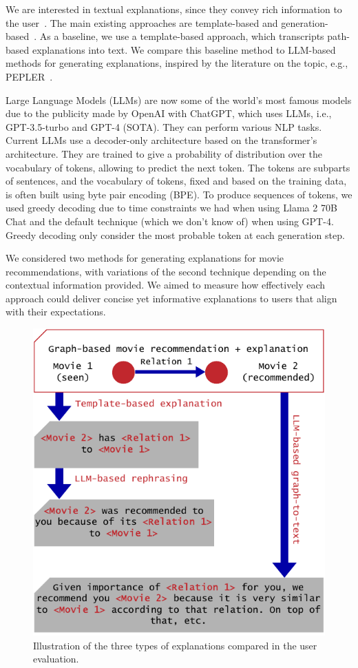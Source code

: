 We are interested in textual explanations, since they convey rich information to the user~\cite{Tintarev2015}. The main existing approaches are template-based and generation-based~\cite{Zhang2020}. As a baseline, we use a template-based approach, which transcripts path-based explanations into text. We compare this baseline method to LLM-based methods for generating explanations, inspired by the literature on the topic, e.g., PEPLER~\cite{Li2023PersonalizedPromptLearningExplainableRecommendation}.


Large Language Models (LLMs) are now some of the world's most famous models due to the publicity made by OpenAI with ChatGPT, which uses LLMs, i.e., GPT-3.5-turbo and GPT-4 (SOTA). They can perform various NLP tasks. Current LLMs use a decoder-only architecture based on the transformer's architecture\cite{yangHarnessingPowerLLMs2023a}. They are trained to give a probability of distribution over the vocabulary of tokens, allowing to predict the next token. %
The tokens are subparts of sentences, and the vocabulary of tokens, fixed and based on the training data, is often built using byte pair encoding (BPE)\cite{radfordImprovingLanguageUnderstanding, touvronLlamaOpenFoundation2023}. To produce sequences of tokens, we used greedy decoding due to time constraints we had when using Llama 2 70B Chat and the default technique (which we don't know of) when using GPT-4. Greedy decoding only consider the most probable token at each generation step.


We considered two methods for generating explanations for movie recommendations, with variations of the second technique depending on the contextual information provided. We aimed to measure how effectively each approach could deliver concise yet informative explanations to users that align with their expectations.

\begin{figure}[!ht]
    \centering
    \includegraphics[width=0.6\linewidth]{images/Example.pdf}
    \caption{Illustration of the three types of explanations compared in the user evaluation.}
    \label{fig:Example}
\end{figure}

